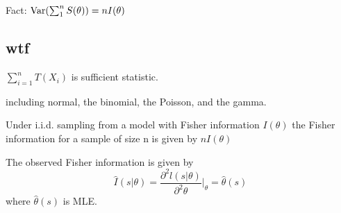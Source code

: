 Fact: $\mathrm{Var}(\sum_1^n S(\theta))=nI(\theta)$
\subsection{wtf}
$\sum_{i=1}^n T(X_i)$ is sufficient statistic.

including normal, the binomial, the Poisson, and the gamma.





Under i.i.d. sampling from a model with Fisher information $I(\theta)$
the Fisher information for a sample of size n is given by $nI(\theta)$


The observed Fisher information is given by
\[\hat I(s|\theta) = \frac{\partial^2 l(s|\theta)}{\partial^2 \theta}\Big|_\theta=\hat\theta(s)\]
where $\hat\theta(s)$ is MLE.












